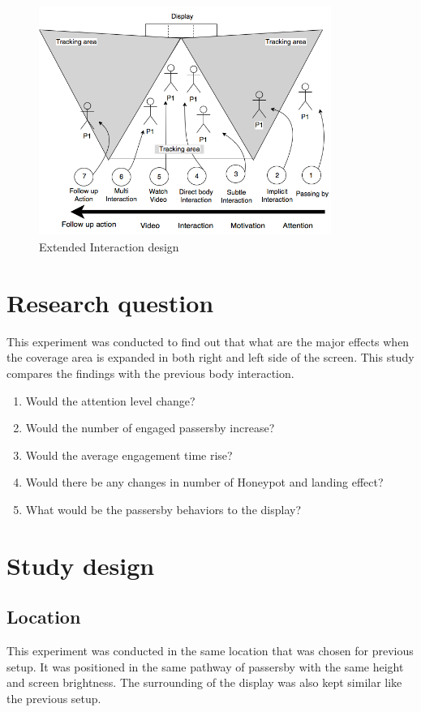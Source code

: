 \begin{figure}[H]
    \centering
    \includegraphics[width=0.85\textwidth,height=7.5cm]{Figures/9/enhanced_interaction_design}
    \caption{Extended Interaction design}%
    \label{fig:KinectExtended}%
\end{figure}




\section{Research question}
This experiment was conducted to find out that what are the major effects when the coverage area is expanded in both right and left side of the screen. This study compares the findings with the previous body interaction.

\begin{enumerate}
\item Would the attention level change?
\item Would the number of engaged passersby increase?
\item Would the average engagement time rise?
\item Would there be any changes in number of Honeypot and landing effect?
\item What would be the passersby behaviors to the display?
\end{enumerate}




\section{Study design}

\subsection{Location}
This experiment was conducted in the same location that was chosen for previous setup. It was positioned in the same pathway of passersby with the same height and screen brightness.  The surrounding of the display was also kept similar like the previous setup.

